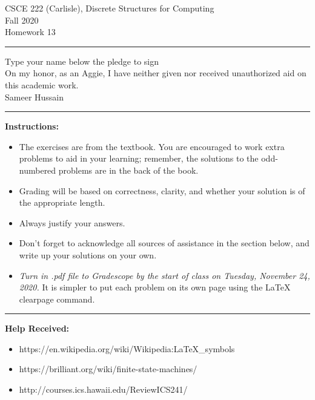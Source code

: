 \documentclass[12pt]{article}  %
\begin{document}
\begin{center}         %
{\large                %
CSCE 222 (Carlisle), Discrete Structures for Computing \\  %
Fall 2020 \\
Homework 13}
\end{center}
\rule{6in}{.1pt}       %
\begin{center}
{\large
Type your name below the pledge to sign\\
On my honor, as an Aggie, I have neither given nor received unauthorized aid on this academic work.\\
Sameer Hussain}
\end{center}


\rule{6in}{.1pt}       %
                    
\noindent              %
{\bf Instructions:}    %

\begin{itemize}        %
\item The exercises are from the textbook.  You are encouraged to work
      extra problems to aid in your learning; remember, the solutions to 
      the odd-numbered problems are in the back of the book.
\item Grading will be based on correctness, clarity, and whether your
      solution is of the appropriate length.
\item Always justify your answers.
\item Don't forget to acknowledge all sources of assistance in the section below, and write up your solutions on your own.
\item {\em Turn in .pdf file to Gradescope by the start of class on Tuesday, November 24, 2020.}  It is simpler to put each problem on its own page using the LaTeX clearpage command.
\end{itemize}


\rule{6in}{.1pt}       %

{\bf Help Received:}    %
\begin{itemize}
\item https://en.wikipedia.org/wiki/Wikipedia:LaTeX\_symbols
\item https://brilliant.org/wiki/finite-state-machines/
\item http://courses.ics.hawaii.edu/ReviewICS241/
\end{itemize}
\end{document}
